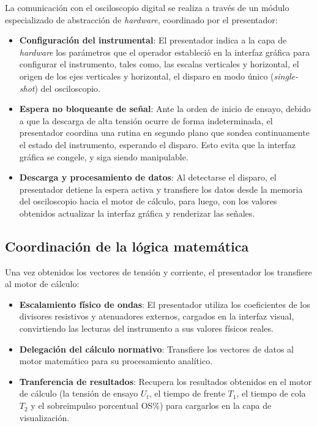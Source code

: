 La comunicación con el osciloscopio digital se realiza a través de un módulo especializado de abstracción de \emph{hardware}, coordinado por el presentador:
\begin{itemize}
    \item \textbf{Configuración del instrumental}: El presentador indica a la capa de \emph{hardware} los parámetros que el operador estableció en la interfaz gráfica para configurar el instrumento, tales como, las escalas verticales y horizontal, el origen de los ejes verticales y horizontal, el disparo en modo único (\emph{single-shot}) del osciloscopio.
    \item \textbf{Espera no bloqueante de señal}: Ante la orden de inicio de ensayo, debido a que la descarga de alta tensión ocurre de forma indeterminada, el presentador coordina una rutina en segundo plano que sondea continuamente el estado del instrumento, esperando el disparo. Esto evita que la interfaz gráfica se congele, y siga siendo manipulable.
    \item \textbf{Descarga y procesamiento de datos}: Al detectarse el disparo, el presentador detiene la espera activa y transfiere los datos desde la memoria del osciloscopio hacia el motor de cálculo, para luego, con los valores obtenidos actualizar la interfaz gráfica y renderizar las señales.
\end{itemize}

\subsection{Coordinación de la lógica matemática}
\label{subsec:coordinacion_calculos}

Una vez obtenidos los vectores de tensión y corriente, el presentador los transfiere al motor de cálculo:
\begin{itemize}
    \item \textbf{Escalamiento físico de ondas}: El presentador utiliza los coeficientes de los divisores resistivos y atenuadores externos, cargados en la interfaz visual, convirtiendo las lecturas del instrumento a sus valores físicos reales.
    \item \textbf{Delegación del cálculo normativo}: Transfiere los vectores de datos al motor matemático para su procesamiento analítico.
    \item \textbf{Tranferencia de resultados}: Recupera los resultados obtenidos en el motor de cálculo (la tensión de ensayo $U_t$, el tiempo de frente $T_1$, el tiempo de cola $T_2$ y el sobreimpulso porcentual OS\%) para cargarlos en la capa de visualización.
\end{itemize}

